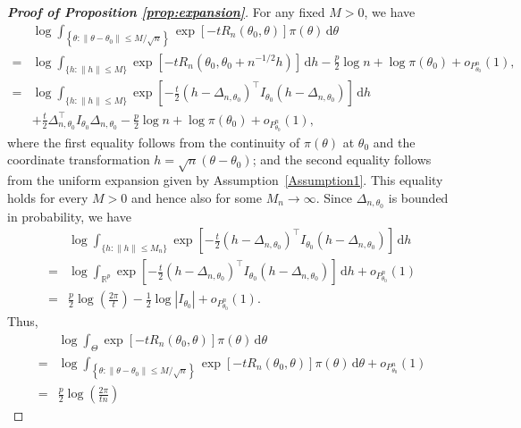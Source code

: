 \documentclass[11pt]{article}
\theoremstyle{plain}
\theoremstyle{definition}
\theoremstyle{remark}
\begin{document}
\begin{appendices}
    \begin{proof}[\textbf{Proof of Proposition \ref{prop:expansion}}]
        For any fixed $M>0$, we have
\begin{align*}
&\log \int_{\left\{ \theta: \|\theta - \theta_0\| \leq M/\sqrt n \right\}}
\exp[-t R_n(\theta_0, \theta)] \pi(\theta)
\, \mathrm d \theta
    \\
    =
    &\log \int_{\{h:\|h\|\leq M\}}\exp\left[ - t R_n(\theta_0,\theta_0+n^{-1/2}h)\right] \, \mathrm d h
    -\frac{p}{2}\log n+\log \pi(\theta_0)+o_{P^n_{\theta_0}}(1),
    \\
    =&\log \int_{\{h:\|h\|\leq M\}}\exp\left[ -\frac{t}{2}(h-\Delta_{n,\theta_0})^\top  I_{\theta_0}(h-\Delta_{n,\theta_0})\right] \, \mathrm dh
    \\
    & +
    \frac{t}{2}\Delta_{n,\theta_0}^\top  I_{\theta_0}\Delta_{n,\theta_0}
    -\frac{p}{2}\log n+\log \pi(\theta_0)+o_{P^n_{\theta_0}}(1),
\end{align*}
where the first equality follows from the continuity of $\pi(\theta)$ at $\theta_0$ and the coordinate transformation $h=\sqrt{n}(\theta-\theta_0)$;
and the second equality follows from the uniform expansion given by Assumption~\ref{Assumption1}.
This equality holds for every $M>0$ and hence also for some $M_n\to \infty$.
Since $\Delta_{n,\theta_0}$ is bounded in probability, we have
        $$
            \begin{aligned}
            &\log \int_{\{h:\|h\|\leq M_n\}}\exp\left[ -\frac{t}{2}(h-\Delta_{n,\theta_0})^\top  I_{\theta_0}(h-\Delta_{n,\theta_0})\right] \, \mathrm dh
                \\
                =&
                \log \int_{\mathbb{R}^p}\exp\left[ -\frac{t}{2}(h-\Delta_{n,\theta_0})^\top  I_{\theta_0}(h-\Delta_{n,\theta_0})\right] \, \mathrm dh+o_{P^n_{\theta_0}}(1)
                \\
                =&
                \frac{p}{2}\log\left(\frac{2\pi}{t}\right)-\frac{1}{2}\log |I_{\theta_0}|
+o_{P^n_{\theta_0}}(1).
            \end{aligned}
        $$
        Thus,
$$
\begin{aligned}
    &\log \int_{\Theta}
\exp[-t R_n(\theta_0, \theta)] \pi(\theta)
\, \mathrm d \theta
\\
    =&
\log \int_{\left\{ \theta: \|\theta - \theta_0\| \leq M/\sqrt n \right\}}
\exp[-t R_n(\theta_0, \theta)] \pi(\theta)
\, \mathrm d \theta
    +o_{P^n_{\theta_0}}(1)\\
    =
    &
        \frac{p}{2}\log\left(\frac{2\pi}{t n}\right)

\end{aligned}$$
\end{proof}
\end{appendices}
\end{document}
